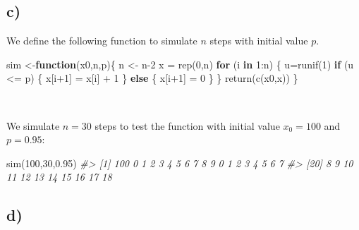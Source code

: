\documentclass[
]{article}
\newenvironment{Shaded}{\begin{snugshade}}{\end{snugshade}}
\newcommand{\CommentTok}[1]{\textcolor[rgb]{0.56,0.35,0.01}{\textit{#1}}}
\newcommand{\ControlFlowTok}[1]{\textcolor[rgb]{0.13,0.29,0.53}{\textbf{#1}}}
\newcommand{\DecValTok}[1]{\textcolor[rgb]{0.00,0.00,0.81}{#1}}
\newcommand{\FloatTok}[1]{\textcolor[rgb]{0.00,0.00,0.81}{#1}}
\newcommand{\FunctionTok}[1]{\textcolor[rgb]{0.00,0.00,0.00}{#1}}
\newcommand{\NormalTok}[1]{#1}
\newcommand{\OtherTok}[1]{\textcolor[rgb]{0.56,0.35,0.01}{#1}}
\newcommand{\SpecialCharTok}[1]{\textcolor[rgb]{0.00,0.00,0.00}{#1}}
\begin{document}
\hypertarget{c-1}{%
\subsection{c)}\label{c-1}}

We define the following function to simulate \(n\) steps with initial
value \(p\).

\begin{Shaded}
\begin{Highlighting}[]
\NormalTok{sim }\OtherTok{\textless{}{-}}\ControlFlowTok{function}\NormalTok{(x0,n,p)\{ }
\NormalTok{    n }\OtherTok{\textless{}{-}}\NormalTok{ n}\DecValTok{{-}2}
\NormalTok{    x }\OtherTok{=} \FunctionTok{rep}\NormalTok{(}\DecValTok{0}\NormalTok{,n)}
    \ControlFlowTok{for}\NormalTok{ (i }\ControlFlowTok{in} \DecValTok{1}\SpecialCharTok{:}\NormalTok{n) \{}
\NormalTok{        u}\OtherTok{=}\FunctionTok{runif}\NormalTok{(}\DecValTok{1}\NormalTok{) }
        \ControlFlowTok{if}\NormalTok{ (u }\SpecialCharTok{\textless{}=}\NormalTok{ p) \{}
\NormalTok{            x[i}\SpecialCharTok{+}\DecValTok{1}\NormalTok{] }\OtherTok{=}\NormalTok{ x[i] }\SpecialCharTok{+} \DecValTok{1}
\NormalTok{        \} }\ControlFlowTok{else}\NormalTok{ \{}
\NormalTok{            x[i}\SpecialCharTok{+}\DecValTok{1}\NormalTok{] }\OtherTok{=} \DecValTok{0}
\NormalTok{        \}}
\NormalTok{    \} }
    \FunctionTok{return}\NormalTok{(}\FunctionTok{c}\NormalTok{(x0,x))}
\NormalTok{\}}
\end{Highlighting}
\end{Shaded}

~

We simulate \(n=30\) steps to test the function with initial value
\(x_{0} = 100\) and \(p=0.95\):

\begin{Shaded}
\begin{Highlighting}[]
\FunctionTok{sim}\NormalTok{(}\DecValTok{100}\NormalTok{,}\DecValTok{30}\NormalTok{,}\FloatTok{0.95}\NormalTok{)}
\CommentTok{\#\textgreater{}  [1] 100   0   1   2   3   4   5   6   7   8   9   0   1   2   3   4   5   6   7}
\CommentTok{\#\textgreater{} [20]   8   9  10  11  12  13  14  15  16  17  18}
\end{Highlighting}
\end{Shaded}

\hypertarget{d-1}{%
\subsection{d)}\label{d-1}}
\end{document}
